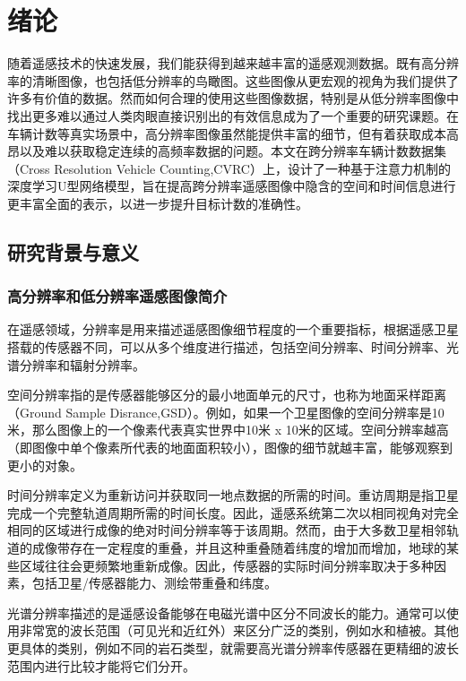 
\chapter{绪论}
随着遥感技术的快速发展，我们能获得到越来越丰富的遥感观测数据。既有高分辨率的清晰图像，也包括低分辨率的鸟瞰图。这些图像从更宏观的视角为我们提供了许多有价值的数据。然而如何合理的使用这些图像数据，特别是从低分辨率图像中找出更多难以通过人类肉眼直接识别出的有效信息成为了一个重要的研究课题。在车辆计数等真实场景中，高分辨率图像虽然能提供丰富的细节，但有着获取成本高昂以及难以获取稳定连续的高频率数据的问题。本文在跨分辨率车辆计数数据集（Cross Resolution Vehicle Counting,CVRC）\cite{2022VehicleCountingVeryLowResolutionAerialImagesCrossResolutionSpatialConsistencyIntraresolutionTimeContinuity}上，设计了一种基于注意力机制\cite{2023AttentionAllYouNeed}的深度学习U型网络模型，旨在提高跨分辨率遥感图像中隐含的空间和时间信息进行更丰富全面的表示，以进一步提升目标计数的准确性。
\section{研究背景与意义}
\subsection{高分辨率和低分辨率遥感图像简介}
在遥感领域，分辨率是用来描述遥感图像细节程度的一个重要指标，根据遥感卫星搭载的传感器不同，可以从多个维度进行描述，包括空间分辨率、时间分辨率、光谱分辨率和辐射分辨率。

空间分辨率指的是传感器能够区分的最小地面单元的尺寸，也称为地面采样距离（Ground Sample Disrance,GSD）。例如，如果一个卫星图像的空间分辨率是10米，那么图像上的一个像素代表真实世界中10米 x 10米的区域。空间分辨率越高（即图像中单个像素所代表的地面面积较小），图像的细节就越丰富，能够观察到更小的对象。

时间分辨率定义为重新访问并获取同一地点数据的所需的时间。重访周期是指卫星完成一个完整轨道周期所需的时间长度。因此，遥感系统第二次以相同视角对完全相同的区域进行成像的绝对时间分辨率等于该周期。然而，由于大多数卫星相邻轨道的成像带存在一定程度的重叠，并且这种重叠随着纬度的增加而增加，地球的某些区域往往会更频繁地重新成像。因此，传感器的实际时间分辨率取决于多种因素，包括卫星/传感器能力、测绘带重叠和纬度。

光谱分辨率描述的是遥感设备能够在电磁光谱中区分不同波长的能力。通常可以使用非常宽的波长范围（可见光和近红外）来区分广泛的类别，例如水和植被。其他更具体的类别，例如不同的岩石类型，就需要高光谱分辨率传感器在更精细的波长范围内进行比较才能将它们分开。

